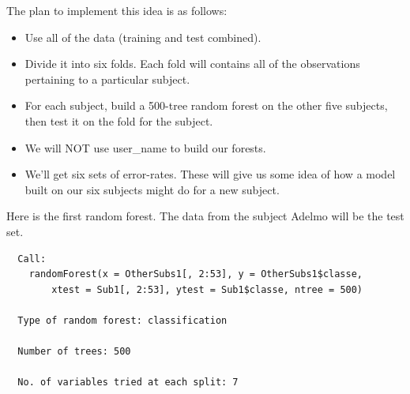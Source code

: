 \documentclass[12pt,twoside]{reedthesis}
\providecommand{\tightlist}{%
  \setlength{\itemsep}{0pt}\setlength{\parskip}{0pt}}
\begin{document}
  The plan to implement this idea is as follows:
  
  \begin{itemize}
  \tightlist
  \item
    Use all of the data (training and test combined).
  \item
    Divide it into six folds. Each fold will contains all of the
    observations pertaining to a particular subject.
  \item
    For each subject, build a 500-tree random forest on the other five
    subjects, then test it on the fold for the subject.
  \item
    We will NOT use user\_name to build our forests.
  \item
    We'll get six sets of error-rates. These will give us some idea of how
    a model built on our six subjects might do for a new subject.
  \end{itemize}
  
  Here is the first random forest. The data from the subject Adelmo will
  be the test set.
  
  \begin{Shaded}
  \begin{Highlighting}[]
  \NormalTok{(}\NormalTok{)}
  \StringTok{ }
  
  \StringTok{ }\NormalTok{wl2[wl2$user_name ==}\StringTok{ }\NormalTok{subjects[}\NormalTok{], ]}
  \StringTok{ }\NormalTok{wl2[wl2$user_name !=}\StringTok{ }\NormalTok{subjects[}\NormalTok{], ]}
  \StringTok{ }\NormalTok{(} \NormalTok{OtherSubs1[, }\NormalTok{:}\NormalTok{], } 
                                  \NormalTok{Sub1[, }\NormalTok{:}\NormalTok{], } 
                                  \NormalTok{)}
  \end{Highlighting}
  \end{Shaded}
  
  \newpage
  
  \begin{verbatim}
  Call:
    randomForest(x = OtherSubs1[, 2:53], y = OtherSubs1$classe, 
        xtest = Sub1[, 2:53], ytest = Sub1$classe, ntree = 500) 
                 
  Type of random forest: classification
  
  Number of trees: 500
  
  No. of variables tried at each split: 7
  \end{verbatim}
  
\end{document}
